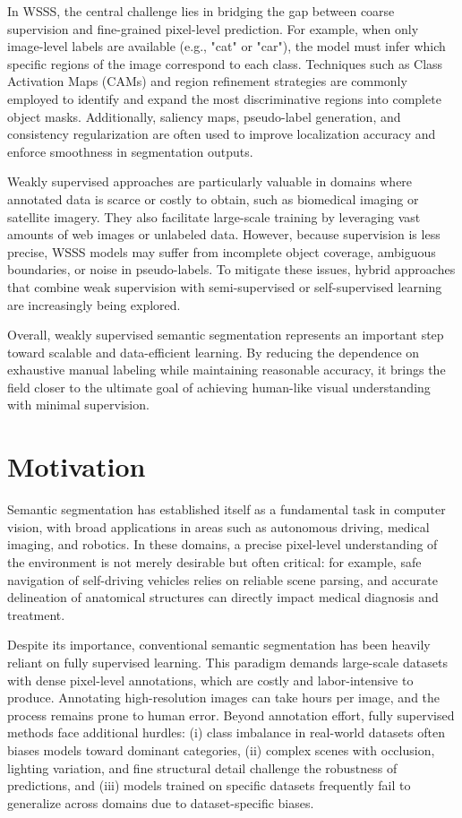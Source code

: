 In WSSS, the central challenge lies in bridging the gap between coarse supervision and fine-grained pixel-level prediction. For example, when only image-level labels are available (e.g., "cat" or "car"), the model must infer which specific regions of the image correspond to each class. Techniques such as Class Activation Maps (CAMs) and region refinement strategies are commonly employed to identify and expand the most discriminative regions into complete object masks. Additionally, saliency maps, pseudo-label generation, and consistency regularization are often used to improve localization accuracy and enforce smoothness in segmentation outputs.

Weakly supervised approaches are particularly valuable in domains where annotated data is scarce or costly to obtain, such as biomedical imaging or satellite imagery. They also facilitate large-scale training by leveraging vast amounts of web images or unlabeled data. However, because supervision is less precise, WSSS models may suffer from incomplete object coverage, ambiguous boundaries, or noise in pseudo-labels. To mitigate these issues, hybrid approaches that combine weak supervision with semi-supervised or self-supervised learning are increasingly being explored.

Overall, weakly supervised semantic segmentation represents an important step toward scalable and data-efficient learning. By reducing the dependence on exhaustive manual labeling while maintaining reasonable accuracy, it brings the field closer to the ultimate goal of achieving human-like visual understanding with minimal supervision.

\section{Motivation}
\label{sec:motivation}

Semantic segmentation has established itself as a fundamental task in computer vision, with broad applications in areas such as autonomous driving, medical imaging, and robotics. In these domains, a precise pixel-level understanding of the environment is not merely desirable but often critical: for example, safe navigation of self-driving vehicles relies on reliable scene parsing, and accurate delineation of anatomical structures can directly impact medical diagnosis and treatment.

Despite its importance, conventional semantic segmentation has been heavily reliant on fully supervised learning. This paradigm demands large-scale datasets with dense pixel-level annotations, which are costly and labor-intensive to produce. Annotating high-resolution images can take hours per image, and the process remains prone to human error. Beyond annotation effort, fully supervised methods face additional hurdles: (i) class imbalance in real-world datasets often biases models toward dominant categories, (ii) complex scenes with occlusion, lighting variation, and fine structural detail challenge the robustness of predictions, and (iii) models trained on specific datasets frequently fail to generalize across domains due to dataset-specific biases.

